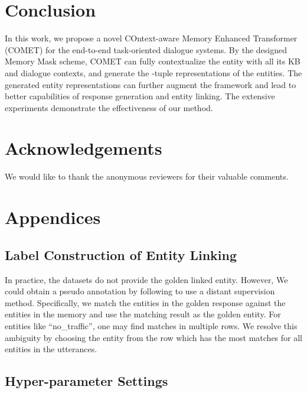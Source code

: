 \documentclass[11pt]{article}
\begin{document}
\section{Conclusion}
\label{sec:conclusion}

In this work, we propose a novel COntext-aware Memory Enhanced Transformer (COMET) for the end-to-end task-oriented dialogue systems. By the designed Memory Mask scheme, COMET can fully contextualize the entity with all its KB and dialogue contexts, and generate the -tuple representations of the entities. The generated entity representations can further augment the framework and lead to better capabilities of response generation and entity linking. The extensive experiments demonstrate the effectiveness of our method. 


\section*{Acknowledgements}
We would like to thank the anonymous reviewers for their valuable comments. 






\clearpage

\appendix

\section{Appendices}

\subsection{Label Construction of Entity Linking}
In practice, the datasets do not provide the golden linked entity. However, We could obtain a pseudo annotation by following \cite{qin-etal-2019-entity} to use a distant supervision method. Specifically, we match the entities in the golden response against the entities in the memory  and use the matching result as the golden entity. For entities like ``no\_traffic'', one may find matches in multiple rows. We resolve this ambiguity by choosing the entity from the row which has the most matches for all entities in the utterances.



\subsection{Hyper-parameter Settings}
\end{document}
